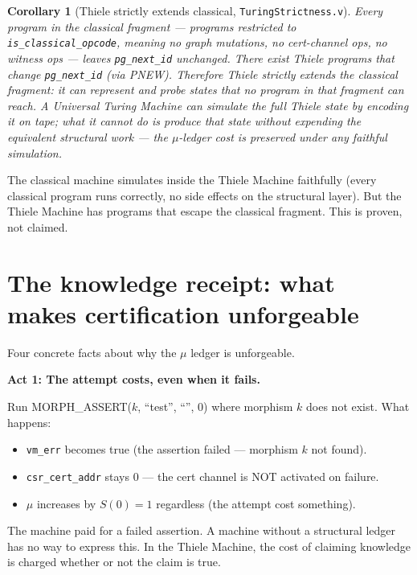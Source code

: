 \documentclass[11pt,a4paper]{article}
\theoremstyle{plain}
\newtheorem{corollary}[theorem]{Corollary}
\theoremstyle{definition}
\theoremstyle{remark}
\begin{document}
\begin{corollary}[Thiele strictly extends classical, \texttt{TuringStrictness.v}]
\label{cor:strict}
Every program in the classical fragment --- programs restricted to \texttt{is\_classical\_opcode}, meaning no graph mutations, no cert-channel ops, no witness ops --- leaves \texttt{pg\_next\_id} unchanged. There exist Thiele programs that change \texttt{pg\_next\_id} (via PNEW). Therefore Thiele strictly extends the classical fragment: it can represent and probe states that no program in that fragment can reach. A Universal Turing Machine can simulate the full Thiele state by encoding it on tape; what it cannot do is produce that state without expending the equivalent structural work --- the $\mu$-ledger cost is preserved under any faithful simulation.
\end{corollary}

The classical machine simulates inside the Thiele Machine faithfully (every classical program runs correctly, no side effects on the structural layer). But the Thiele Machine has programs that escape the classical fragment. This is proven, not claimed.

\section{The knowledge receipt: what makes certification unforgeable}
\label{sec:receipt}

Four concrete facts about why the $\mu$ ledger is unforgeable.

\medskip
\noindent\textbf{Act 1: The attempt costs, even when it fails.}

Run MORPH\_ASSERT($k$, ``test'', ``'', 0) where morphism $k$ does not exist. What happens:
\begin{itemize}
\item \texttt{vm\_err} becomes true (the assertion failed --- morphism $k$ not found).
\item \texttt{csr\_cert\_addr} stays 0 --- the cert channel is NOT activated on failure.
\item $\mu$ increases by $S(0) = 1$ regardless (the attempt cost something).
\end{itemize}

The machine paid for a failed assertion. A machine without a structural ledger has no way to express this. In the Thiele Machine, the cost of claiming knowledge is charged whether or not the claim is true.
\end{document}
